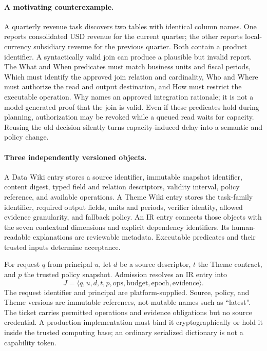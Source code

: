 \documentclass[11pt]{article}
\begin{document}
\paragraph{A motivating counterexample.}
A quarterly revenue task discovers two tables with identical column names. One reports consolidated USD revenue for the current quarter; the other reports local-currency subsidiary revenue for the previous quarter. Both contain a product identifier. A syntactically valid join can produce a plausible but invalid report. The What and When predicates must match business units and fiscal periods, Which must identify the approved join relation and cardinality, Who and Where must authorize the read and output destination, and How must restrict the executable operation. Why names an approved integration rationale; it is not a model-generated proof that the join is valid. Even if these predicates hold during planning, authorization may be revoked while a queued read waits for capacity. Reusing the old decision silently turns capacity-induced delay into a semantic and policy change.

\paragraph{Three independently versioned objects.}
A Data Wiki entry stores a source identifier, immutable snapshot identifier, content digest, typed field and relation descriptors, validity interval, policy reference, and available operations. A Theme Wiki entry stores the task-family identifier, required output fields, units and periods, verifier identity, allowed evidence granularity, and fallback policy. An IR entry connects those objects with the seven contextual dimensions and explicit dependency identifiers. Its human-readable explanations are reviewable metadata. Executable predicates and their trusted inputs determine acceptance.

For request $q$ from principal $u$, let $d$ be a source descriptor, $t$ the Theme contract, and $p$ the trusted policy snapshot. Admission resolves an IR entry into
\begin{equation}
J=\langle q,u,d,t,p,\mathrm{ops},\mathrm{budget},\mathrm{epoch},\mathrm{evidence}\rangle.
\end{equation}
The request identifier and principal are platform-supplied. Source, policy, and Theme versions are immutable references, not mutable names such as ``latest''. The ticket carries permitted operations and evidence obligations but no source credential. A production implementation must bind it cryptographically or hold it inside the trusted computing base; an ordinary serialized dictionary is not a capability token.
\end{document}
